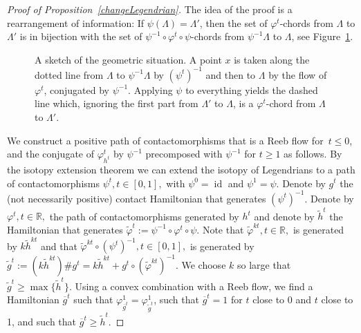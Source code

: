 \documentclass{amsart}
\newcommand{\RR}{\mathbb{R}}
\newcommand{\id}{\textbf{\textit{I}}}
\renewcommand{\id}{\operatorname{id}}
\newtheorem{theorem}{Theorem}
\theoremstyle{definition}
\theoremstyle{remark}
\numberwithin{equation}{section}
\begin{document}
\begin{proof}[Proof of Proposition~\ref{changeLegendrian}]
	The idea of the proof is a rearrangement of information: If $\psi(\Lambda)=\Lambda'$, then the set of $\varphi^t$-chords from $\Lambda$ to $\Lambda'$ is in bijection with the set of $\psi^{-1}\circ\varphi^t\circ\psi$-chords from $\psi^{-1}\Lambda$ to $\Lambda$, see Figure~\ref{fig:LambdaToLambdaprime}.
	
	\begin{figure}[h]
	\caption{A sketch of the geometric situation. A point $x$ is taken along the dotted line from $\Lambda$ to $\psi^{-1}\Lambda$ by $(\psi^t)^{-1}$ and then to $\Lambda$ by the flow of $\varphi^t$, conjugated by $\psi^{-1}$. Applying $\psi$ to everything yields the dashed line which, ignoring the first part from $\Lambda'$ to $\Lambda$, is a $\varphi^t$-chord from $\Lambda$ to $\Lambda'$.}
	\label{fig:LambdaToLambdaprime}
\end{figure}

We construct a positive path of contactomorphisms that is a Reeb flow for~$t\leq 0$, and the conjugate of $\varphi_{h^t}^t$ by $\psi^{-1}$ precomposed with $\psi^{-1}$ for $t\geq 1$ as follows. By the isotopy extension theorem we can extend the isotopy of Legendrians to a path of contactomorphisms $\psi^t,t\in[0,1],$ with $\psi^0=\id$ and $\psi^1=\psi$. Denote by $g^t$ the (not necessarily positive) contact Hamiltonian that generates $(\psi^t)^{-1}$. Denote by $\varphi^t,t\in\RR,$ the path of contactomorphisms generated by $h^t$ and denote by $\tilde h^t$ the Hamiltonian that generates $\tilde\varphi^t:=\psi^{-1}\circ\varphi^t\circ\psi$. 
Note that $\tilde\varphi^{kt},t\in\RR,$ is generated by $k \tilde h^{kt}$ and that $\tilde\varphi^{kt}\circ(\psi^t)^{-1},t\in[0,1],$ is generated by $\tilde g^t:=(k\tilde h^{kt})\#g^t=k\tilde h^{kt}+g^t\circ(\tilde\varphi^{kt})^{-1}$. 
We choose $k$ so large that $\tilde g^t\geq\max\{\tilde h^t\}$. 
Using a convex combination with a Reeb flow, we find a Hamiltonian $\overline g^t$ such that $\varphi_{\overline g^t}^1=\varphi_{\tilde g^t}^1$, such that $\overline g^t=1$ for $t$ close to 0 and $t$ close to 1, and such that $\overline g^t\geq \tilde h^t$.


\end{proof}
\end{document}
